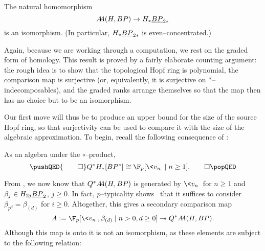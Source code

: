 \begin{theorem}\label{HFpBPCooperationsTheorem}
The natural homomorphism \[\AA(H, BP) \to H_* \OS{BP}{2*}\] is an isomorphism.  (In particular, \(H_* \OS{BP}{2*}\) is even--concentrated.)
\end{theorem}

\noindent Again, because we are working through a computation, we rest on the graded form of homology.  This result is proved by a fairly elaborate counting argument: the rough idea is to show that the topological Hopf ring is polynomial, the comparison map is surjective (or, equivalently, it is surjective on \(\ast\)--indecomposables), and the graded ranks arrange themselves so that the map then has no choice but to be an isomorphism.

Our first move will thus be to produce an upper bound for the size of the source Hopf ring, so that surjectivity can be used to compare it with the size of the algebraic approximation.  To begin, recall the following consequence of :

\begin{corollary}
As an algebra under the \(\circ\)--product,
\[\pushQED{\qed}
Q^* H_*[BP^*] \cong \F_p[\<v_n\> \mid n \ge 1]. \qedhere
\popQED\]
\end{corollary}

\noindent From , we now know that \(Q^* \AA(H, BP)\) is generated by \(\<v_n\>\) for \(n \ge 1\) and \(\beta_j \in H_{2j} \OS{BP}{2}\), \(j \ge 0\).  In fact, \(p\)--typicality shows~\cite[Lemma 4.14]{RavenelWilsonHopfRingForMU} that it suffices to consider \(\beta_{p^d} = \beta_{(d)}\) for \(i \ge 0\).  Altogether, this gives a secondary comparison map \[A := \F_p[\<v_n\>, \beta_{(d)} \mid n > 0, d \ge 0] \onto Q^* \AA(H, BP).\]  Although this map is onto it is not an isomorphism, as these elements are subject to the following relation:

